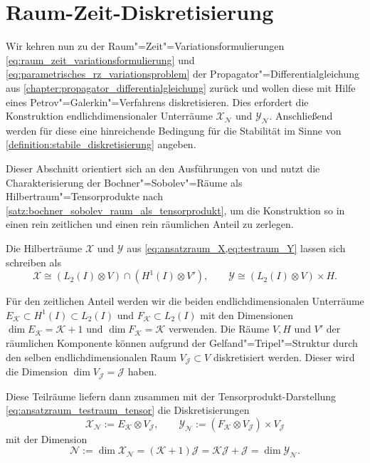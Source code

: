 \documentclass[../main.tex]{subfiles}
\begin{document}
\section{Raum-Zeit-Diskretisierung} %
\label{section:raum_zeit_diskretisierung}

Wir kehren nun zu der Raum"=Zeit"=Variationsformulierungen \cref{eq:raum_zeit_variationsformulierung} und \cref{eq:parametrisches_rz_variationsproblem} der Propagator"=Differentialgleichung aus \cref{chapter:propagator_differentialgleichung} zurück und wollen diese mit Hilfe eines Petrov"=Galerkin"=Verfahrens diskretisieren.
Dies erfordert die Konstruktion endlichdimensionaler Unterräume $\mathcal X_{\mathcal N}$ und $\mathcal Y_{\mathcal N}$.
Anschließend werden für diese eine hinreichende Bedingung für die Stabilität im Sinne von \cref{definition:stabile_diskretisierung} angeben.

Dieser Abschnitt orientiert sich an den Ausführungen von \textcite{Andreev:2012uh,Andreev:2012ep} und nutzt die Charakterisierung der Bochner"=Sobolev"=Räume als Hilbertraum"=Tensorprodukte nach \cref{satz:bochner_sobolev_raum_als_tensorprodukt}, um die Konstruktion so in einen rein zeitlichen und einen rein räumlichen Anteil zu zerlegen.

\begin{Korollar}\label{korollar:ansatz_und_testraum_als_tensorprodukt}
    Die Hilberträume $\mathcal X$ und $\mathcal Y$ aus \cref{eq:ansatzraum_X,eq:testraum_Y} lassen sich schreiben als
    \begin{equation}\label{eq:ansatzraum_testraum_tensor}
        \mathcal X \cong (L_2(I) \otimes V) \cap (H^{1}(I) \otimes V'),
        \qquad
        \mathcal Y \cong (L_{2}(I) \otimes V) \times H.
    \end{equation}
\end{Korollar}

Für den zeitlichen Anteil werden wir die beiden endlichdimensionalen Unterräume $E_{\mathcal K} \subset H^{1}(I) \subset L_{2}(I)$ und $F_{\mathcal K} \subset L_{2}(I)$ mit den Dimensionen $\dim E_{\mathcal K} = \mathcal K + 1$ und $\dim F_{\mathcal K} = \mathcal K$ verwenden.
Die Räume $V, H$ und $V'$ der räumlichen Komponente können aufgrund der Gelfand"=Tripel"=Struktur
durch den selben endlichdimensionalen Raum $V_{\mathcal J} \subset V$ diskretisiert werden.
Dieser wird die Dimension $\dim V_{\mathcal J} = \mathcal J$ haben.

Diese Teilräume liefern dann zusammen mit der Tensorprodukt-Darstellung \cref{eq:ansatzraum_testraum_tensor} die Diskretisierungen
\begin{equation}
\label{eq:diskrete_tensor_raueme}
    \mathcal X_{\mathcal N} := E_{\mathcal K} \otimes V_{\mathcal J}, \qquad \mathcal Y_{\mathcal N} := (F_{\mathcal K} \otimes V_{\mathcal J}) \times V_{\mathcal J}
\end{equation}
mit der Dimension
\begin{equation}
    \mathcal N := \dim \mathcal X_{\mathcal N} = (\mathcal K + 1) \mathcal J = \mathcal K \mathcal J + \mathcal J = \dim \mathcal Y_{\mathcal N}.
\end{equation}
\end{document}
